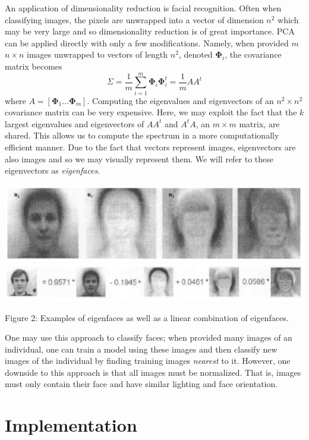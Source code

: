 \documentclass[ 12pt ]{article}
\begin{document}
An application of dimensionality reduction is facial recognition. Often when classifying images, the pixels are unwrapped into a vector of dimension $n^2$ which may be very large and so
dimensionality reduction is of great importance. PCA can be applied directly with only a few modifications. Namely, when provided $m$ $n \times n$ images unwrapped to vectors of length
$n^2$, denoted $\mathbf{\Phi}_i$, the covariance matrix becomes $$\Sigma = \frac{1}{m} \sum_{i=1}^m \mathbf{\Phi}_i \mathbf{\Phi}_i^t = \frac{1}{m}AA^t$$ where $A = \left [
\mathbf{\Phi}_1 \hdots \mathbf{\Phi}_m \right ]$. Computing the eigenvalues and eigenvectors of an $n^2 \times n^2$ covariance matrix can be very expensive. Here, we may exploit the fact
that the $k$ largest eigenvalues and eigenvectors of $AA^t$ and $A^tA$, an $m \times m$ matrix, are shared. This allows us to compute the spectrum in a more computationally efficient
manner. Due to the fact that vectors represent images, eigenvectors are also images and so we may visually represent them. We will refer to these eigenvectors as \textit{eigenfaces}.
\begin{center}
    \includegraphics[scale=0.5]{eigenfaces}
    \includegraphics[scale=0.7]{eigenfaces_lc}
\end{center}
\begin{center}
    \scriptsize
    Figure 2: Examples of eigenfaces as well as a linear combination of eigenfaces.
\end{center}
One may use this approach to classify faces; when provided many images of an individual, one can train a model using these images and then classify new images of the individual
by finding training images \textit{nearest} to it. However, one downside to this approach is that all images must be normalized. That is, images must only contain their face and have
similar lighting and face orientation.


\section*{Implementation}
\end{document}
